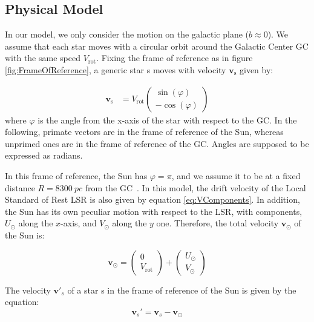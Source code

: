 \subsection{Physical Model}\label{subsec:PhysicalModel}


In our model, we only consider the motion on the galactic plane ($b\approx0$). We assume that each star moves with a circular orbit around the Galactic Center GC with the same speed $V_{\text{rot}}$. Fixing the frame of reference as in figure \ref{fig:FrameOfReference}, a generic star s moves with velocity $\bm{v}_{\text{s}}$ given by:

\begin{equation}\label{eq:VComponents}
    \begin{aligned}
        \bm{v}_{\text{s}} &= V_{\text{rot}}\begin{pmatrix} \sin(\varphi) \\ -\cos(\varphi) \end{pmatrix}
    \end{aligned}
\end{equation}
\noindent
where $\varphi$ is the angle from the x-axis of the star with respect to the GC. In the following, primate vectors are in the frame of reference of the Sun, whereas unprimed ones are in the frame of reference of the GC. Angles are supposed to be expressed as radians.



In this frame of reference, the Sun has $\varphi = \pi$, and we assume it to be at a fixed distance $R=\qty{8300}{pc}$ from the GC~\cite{GalacticKinematics}. In this model, the drift velocity of the Local Standard of Rest LSR is also given by equation \ref{eq:VComponents}. In addition, the Sun has its own peculiar motion with respect to the LSR, with components, $U_{\odot}$ along the $x$-axis, and $V_{\odot}$ along the $y$ one. Therefore, the total velocity $\bm{v}_{\odot}$ of the Sun is:

\begin{equation}\label{eq:VSun}
    \bm{v}_{\odot} = \begin{pmatrix} 0 \\ V_{\text{rot}} \end{pmatrix} + \begin{pmatrix} U_{\odot} \\ V_{\odot} \end{pmatrix}
\end{equation}

\noindent
The velocity $\bm{v'}_s$ of a star s in the frame of reference of the Sun is given by the equation:
\begin{equation}\label{eq:ReferenceFrame}
    \bm{v}_s' = \bm{v}_s - \bm{v}_{\odot} 
\end{equation}

